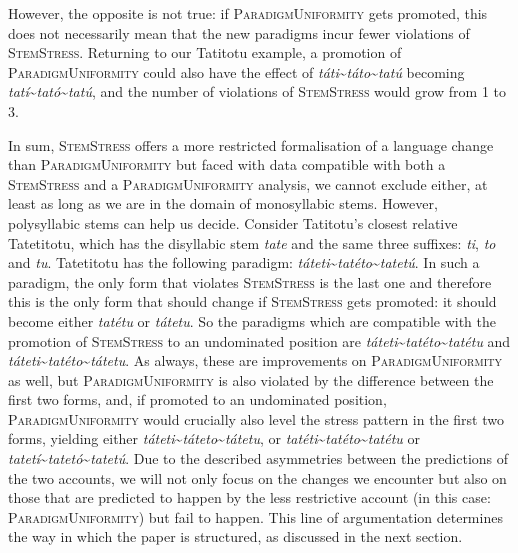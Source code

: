 \documentclass[output=paper,modfonts,nonflat
]{langsci/langscibook}
\begin{document}
However, the opposite is not true: if \textsc{ParadigmUniformity} gets promoted, this does not necessarily mean that the new paradigms incur fewer violations of \textsc{StemStress}. Returning to our Tatitotu example, a promotion of \textsc{ParadigmUniformity} could also have the effect of \textit{táti}\textasciitilde{}\textit{táto}\textasciitilde{}\textit{tatú} becoming \textit{tatí}\textasciitilde{}\textit{tató}\textasciitilde{}\textit{tatú}, and the number of violations of \textsc{StemStress} would grow from 1 to 3. 

In sum, \textsc{StemStress} offers a more restricted formalisation of a language change than \textsc{ParadigmUniformity} but faced with data compatible with both a \textsc{StemStress} and a \textsc{ParadigmUniformity} analysis, we cannot exclude either, at least as long as we are in the domain of monosyllabic stems. However, polysyllabic stems can help us decide. Consider Tatitotu's closest relative Tatetitotu, which has the disyllabic stem \textit{tate} and the same three suffixes: \textit{ti}, \textit{to} and \textit{tu}. Tatetitotu has the following paradigm:  \textit{táteti}\textasciitilde{}\textit{tatéto}\textasciitilde{}\textit{tatetú}. In such a paradigm, the only form that violates \textsc{StemStress}  is the last one and therefore this is the only form that should change if \textsc{StemStress} gets promoted: it should become either \textit{tatétu} or \textit{tátetu}. So the paradigms which are compatible with the promotion of \textsc{StemStress} to an undominated position are \textit{táteti}\textasciitilde{}\textit{tatéto}\textasciitilde{}\textit{tatétu} and \textit{táteti}\textasciitilde{}\textit{tatéto}\textasciitilde{}\textit{tátetu}. As always, these are improvements on \textsc{ParadigmUni\-formity} as well, but \textsc{ParadigmUniformity} is also violated by the difference between the first two forms, and, if promoted to an undominated position, \textsc{ParadigmUniformity} would crucially also level the stress pattern in the first two forms, yielding either \textit{táteti}\textasciitilde{}\textit{táteto}\textasciitilde{}\textit{tátetu}, or \textit{tatéti}\textasciitilde{}\textit{tatéto}\textasciitilde{}\textit{tatétu} or \textit{tatetí}\textasciitilde{}\textit{tatetó}\textasciitilde{}\textit{tatetú}. Due to the described asymmetries between the predictions of the two accounts, we will not only focus on the changes we encounter but also on those that are predicted to happen by the less restrictive account (in this case: \textsc{ParadigmUniformity}) but fail to happen. This line of argumentation determines the way in which the paper is structured, as discussed in the next section. 
\end{document}
